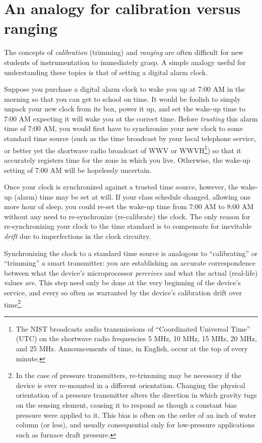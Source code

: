 \filbreak
\section{An analogy for calibration versus ranging}

\label{calibration_versus_ranging}

The concepts of \textit{calibration} (trimming) and \textit{ranging} are often difficult for new students of instrumentation to immediately grasp.  A simple analogy useful for understanding these topics is that of setting a digital alarm clock.

Suppose you purchase a digital alarm clock to wake you up at 7:00 AM in the morning so that you can get to school on time.  It would be foolish to simply unpack your new clock from its box, power it up, and set the wake-up time to 7:00 AM expecting it will wake you at the correct time.  Before \textit{trusting} this alarm time of 7:00 AM, you would first have to synchronize your new clock to some standard time source (such as the time broadcast by your local telephone service, or better yet the shortwave radio broadcast of WWV or WWVH\footnote{The NIST broadcasts audio transmissions of ``Coordinated Universal Time'' (UTC) on the shortwave radio frequencies 5 MHz, 10 MHz, 15 MHz, 20 MHz, and 25 MHz.  Announcements of time, in English, occur at the top of every minute.}) so that it accurately registers time for the zone in which you live.  Otherwise, the wake-up setting of 7:00 AM will be hopelessly uncertain.

Once your clock is synchronized against a trusted time source, however, the wake-up (alarm) time may be set at will.  If your class schedule changed, allowing one more hour of sleep, you could re-set the wake-up time from 7:00 AM to 8:00 AM without any need to re-synchronize (re-calibrate) the clock.  The only reason for re-synchronizing your clock to the time standard is to compensate for inevitable \textit{drift} due to imperfections in the clock circuitry.

Synchronizing the clock to a standard time source is analogous to ``calibrating'' or ``trimming'' a smart transmitter: you are establishing an accurate correspondence between what the device's microprocessor \textit{perceives} and what the actual (real-life) values \textit{are}.  This step need only be done at the very beginning of the device's service, and every so often as warranted by the device's calibration drift over time\footnote{In the case of pressure transmitters, re-trimming may be necessary if the device is ever re-mounted in a different orientation.  Changing the physical orientation of a pressure transmitter alters the direction in which gravity tugs on the sensing element, causing it to respond as though a constant bias pressure were applied to it.  This bias is often on the order of an inch of water column (or less), and usually consequential only for low-pressure applications such as furnace draft pressure.}.


